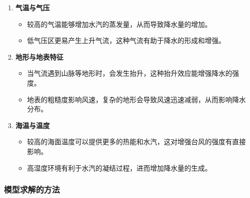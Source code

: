 \documentclass[withoutpreface,bwprint]{cumcmthesis}
\begin{document}
\begin{enumerate}
    \item[(1)] \textbf{气温与气压}
               
                \begin{itemize}
                    \item 较高的气温能够增加水汽的蒸发量，从而导致降水量的增加。

                    \item 低气压区更易产生上升气流，这种气流有助于降水的形成和增强。
                \end{itemize}

    \item[(2)] \textbf{地形与地表特征}
               
                \begin{itemize}
                    \item 当气流遇到山脉等地形时，会发生抬升，这种抬升效应能增强降水的强度。

                    \item 地表的粗糙度影响风速，复杂的地形会导致风速迅速减弱，从而影响降水分布。
                \end{itemize}

    \item[(3)] \textbf{海温与温度}
               
                \begin{itemize}
                    \item 较高的海面温度可以提供更多的热能和水汽，这对增强台风的强度有直接影响。

                    \item 高湿度环境有利于水汽的凝结过程，进而增加降水量的生成。
                \end{itemize}

\end{enumerate}

\subsubsection{模型求解的方法}
\end{document}

